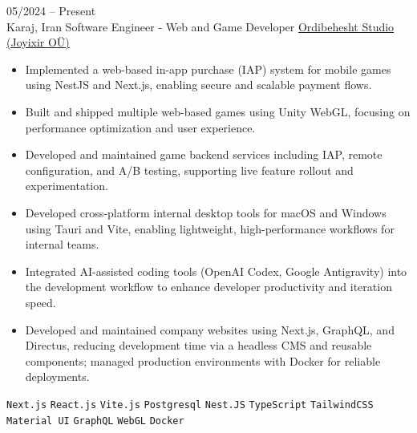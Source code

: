 \entry
{05/2024 -- Present \\ Karaj, Iran}
{Software Engineer - Web and Game Developer}
{\href{https://www.joyixir.com/}{Ordibehesht Studio  (Joyixir OÜ)}}
{\vspace{-10pt}
    \begin{itemize}[noitemsep,topsep=0pt,parsep=0pt,partopsep=0pt, leftmargin=-1pt]
        \item Implemented a web-based in-app purchase (IAP) system for mobile games using NestJS and Next.js, enabling secure and scalable payment flows.
        \item Built and shipped multiple web-based games using Unity WebGL, focusing on performance optimization and user experience.
        \item Developed and maintained game backend services including IAP, remote configuration, and A/B testing, supporting live feature rollout and experimentation.
        \item Developed cross-platform internal desktop tools for macOS and Windows using Tauri and Vite, enabling lightweight, high-performance workflows for internal teams.
        \item Integrated AI-assisted coding tools (OpenAI Codex, Google Antigravity) into the development workflow to enhance developer productivity and iteration speed.
        \item Developed and maintained company websites using Next.js, GraphQL, and Directus, reducing development time via a headless CMS and reusable components; managed production environments with Docker for reliable deployments.
    \end{itemize}
    \texttt{Next.js} \slashsep \texttt{React.js} \slashsep \texttt{Vite.js} \slashsep \texttt{Postgresql} \slashsep \texttt{Nest.JS} \slashsep \texttt{TypeScript} \slashsep \texttt{TailwindCSS} \slashsep \texttt{Material UI} \slashsep \texttt{GraphQL} \slashsep \texttt{WebGL} \slashsep \texttt{Docker}
}
